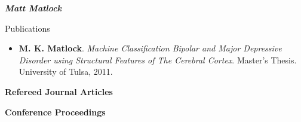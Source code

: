 \documentclass[10pt]{article}
\begin{document}
\begin{cv}{\huge \it \bfseries Matt Matlock}
\renewenvironment{thebibliography}[1]{
\setlength{\topsep}{0em}
\setlength{\labelsep}{.5em}
\begin{etaremune}{
\setlength{\itemsep}{0.5em}}
}{\end{etaremune}}
\renewcommand{\bibitem}[1]{\item}

\setlength{\cvlabelsep}{0mm}
\setlength{\cvlabelwidth}{0mm}
\renewcommand{\labelitemi}{}

\begin{cvlist}{Publications}

\item {\begin{itemize}\item{\bf M. K. Matlock}. \emph{Machine Classification Bipolar and Major Depressive Disorder using Structural Features of The Cerebral Cortex}. Master's Thesis. University of Tulsa, 2011. \end{itemize}}

\item {\bf Refereed Journal Articles}
\item{ }


\newpage
\item {\bf   Conference Proceedings}
\item{ }



\end{cvlist}
\end{cv}
\end{document}
